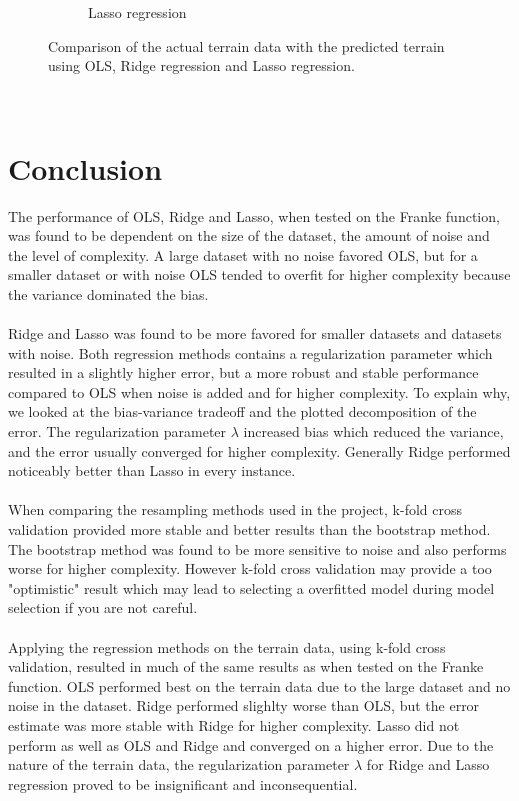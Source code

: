 \documentclass[a4paper,twocolumn]{article}
\begin{document}
\begin{figure}
\begin{subfigure}[b]{0.5\columnwidth}
        \caption{Lasso regression}
    \end{subfigure}
    \captionsetup{width=1.5\columnwidth}
    \caption{Comparison of the actual terrain data with the predicted terrain using OLS, Ridge regression and Lasso regression.}
\end{figure}\\
\newpage
\section{Conclusion}
The performance of OLS, Ridge and Lasso, when tested on the Franke function, was found to be dependent on the size of the dataset, the amount of noise and the level of complexity. A large dataset with no noise favored OLS, but for a smaller dataset or with noise OLS tended to overfit for higher complexity because the variance dominated the bias.\\
\\
Ridge and Lasso was found to be more favored for smaller datasets and datasets with noise. Both regression methods contains a regularization parameter which resulted in a slightly higher error, but a more robust and stable performance compared to OLS when noise is added and for higher complexity. To explain why, we looked at the bias-variance tradeoff and the plotted decomposition of the error. The regularization parameter $\lambda$ increased bias which reduced the variance, and the error usually converged for higher complexity. Generally Ridge performed noticeably better than Lasso in every instance.\\
\\
When comparing the resampling methods used in the project, k-fold cross validation provided more stable and better results than the bootstrap method. The bootstrap method was found to be more sensitive to noise and also performs worse for higher complexity. However k-fold cross validation may provide a too "optimistic" result which may lead to selecting a overfitted model during model selection if you are not careful.\\
\\
Applying the regression methods on the terrain data, using k-fold cross validation, resulted in much of the same results as when tested on the Franke function. OLS performed best on the terrain data due to the large dataset and no noise in the dataset. Ridge performed slighlty worse than OLS, but the error estimate was more stable with Ridge for higher complexity. Lasso did not perform as well as OLS and Ridge and converged on a higher error. Due to the nature of the terrain data, the regularization parameter $\lambda$ for Ridge and Lasso regression proved to be insignificant and inconsequential. 
\end{document}
